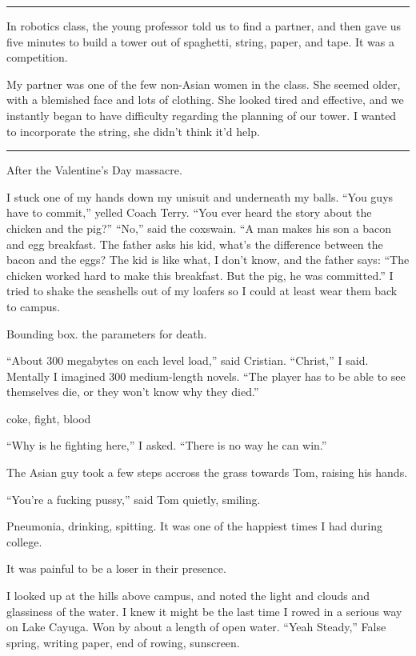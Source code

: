 \plainfancybreak{12pt}{2}{* * *}

In robotics class, the young professor told us to find a partner, and then gave
us five minutes to build a tower out of spaghetti, string, paper, and tape.  It
was a competition.

My partner was one of the few non-Asian women in the class.  She seemed older,
with a blemished face and lots of clothing.  She looked tired and effective, and
we instantly began to have difficulty regarding the planning of our tower.  I
wanted to incorporate the string, she didn't think it'd help.

\plainfancybreak{12pt}{2}{* * *}

After the Valentine's Day massacre.

I stuck one of my hands down my unisuit and underneath my balls.  ``You guys
have to commit,'' yelled Coach Terry.  ``You ever heard the story about the
chicken and the pig?'' ``No,'' said the coxswain.  ``A man makes his son a bacon
and egg breakfast.  The father asks his kid, what's the difference between the
bacon and the eggs?  The kid is like what, I don't know, and the father says:
``The chicken worked hard to make this breakfast.  But the pig, he was
committed.'' I tried to shake the seashells out of my loafers so I could at
least wear them back to campus. 

Bounding box.  the parameters for death.

``About 300 megabytes on each level load,'' said Cristian.  ``Christ,'' I said.
Mentally I imagined 300 medium-length novels.  ``The player has to be able to
see themselves die, or they won't know why they died.'' 

coke, fight, blood

``Why is he fighting here,'' I asked.  ``There is no way he can win.'' 

The Asian guy took a few steps accross the grass towards Tom, raising his hands.

``You're a fucking pussy,'' said Tom quietly, smiling. 

Pneumonia, drinking, spitting.  It was one of the happiest times I had during college.

It was painful to be a loser in their presence.  

I looked up at the hills above campus, and noted the light and clouds and
glassiness of the water.  I knew it might be the last time I rowed in a serious
way on Lake Cayuga.  Won by about a length of open water.  ``Yeah Steady,'' False
spring, writing paper, end of rowing, sunscreen.

